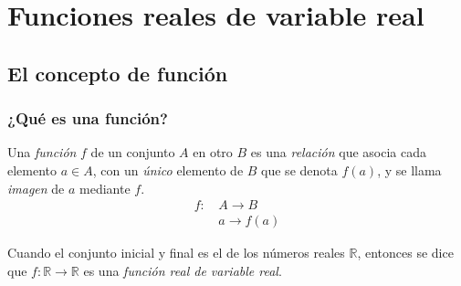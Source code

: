 \section{Funciones reales de variable real}


\subsection{El concepto de función}

\begin{frame}
	\frametitle{¿Qué es una función?}
	\begin{definicion}
		Una \emph{función} $f$ de un conjunto $A$ en otro $B$ es una \emph{relación} que asocia cada elemento $a\in A$, con un \emph{único} elemento de $B$ que se denota $f(a)$, y se llama \emph{imagen} de $a$ mediante $f$.
		\begin{align*}
			f:\, & A\longrightarrow B    \\
			     & a\longrightarrow f(a) 
		\end{align*}
	\end{definicion}
	
	\begin{center}
		\scalebox{1}{}
	\end{center}
	Cuando el conjunto inicial y final es el de los números reales $\mathbb{R}$, entonces se dice que 
	$f:\mathbb{R}\rightarrow \mathbb{R}$ es una \emph{función real de variable real}.
\end{frame}


